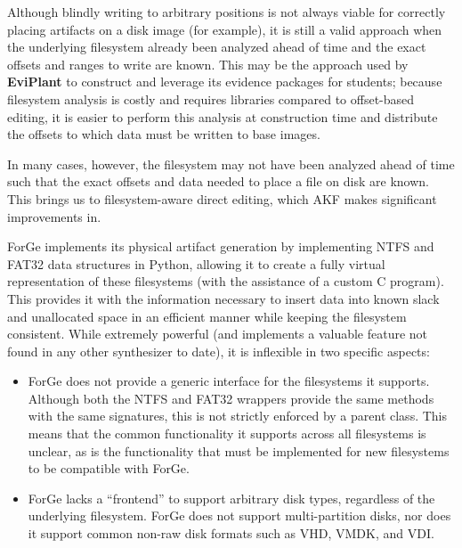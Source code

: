 Although blindly writing to arbitrary positions is not always viable for
correctly placing artifacts on a disk image (for example), it is still a
valid approach when the underlying filesystem already been analyzed
ahead of time and the exact offsets and ranges to write are known. This
may be the approach used by \textbf{EviPlant} to construct and leverage
its evidence packages for students; because filesystem analysis is
costly and requires libraries compared to offset-based editing, it is
easier to perform this analysis at construction time and distribute the
offsets to which data must be written to base images.

In many cases, however, the filesystem may not have been analyzed ahead
of time such that the exact offsets and data needed to place a file on
disk are known. This brings us to filesystem-aware direct editing, which
AKF makes significant improvements in.

ForGe implements its physical artifact generation by implementing NTFS
and FAT32 data structures in Python, allowing it to create a fully
virtual representation of these filesystems (with the assistance of a
custom C program). This provides it with the information necessary to
insert data into known slack and unallocated space in an efficient
manner while keeping the filesystem consistent. While extremely powerful
(and implements a valuable feature not found in any other synthesizer to
date), it is inflexible in two specific aspects:

\begin{itemize}
\tightlist
\item
  ForGe does not provide a generic interface for the filesystems it
  supports. Although both the NTFS and FAT32 wrappers provide the same
  methods with the same signatures, this is not strictly enforced by a
  parent class. This means that the common functionality it supports
  across all filesystems is unclear, as is the functionality that must
  be implemented for new filesystems to be compatible with ForGe.
\item
  ForGe lacks a ``frontend'' to support arbitrary disk types, regardless
  of the underlying filesystem. ForGe does not support multi-partition
  disks, nor does it support common non-raw disk formats such as VHD,
  VMDK, and VDI.
\end{itemize}

